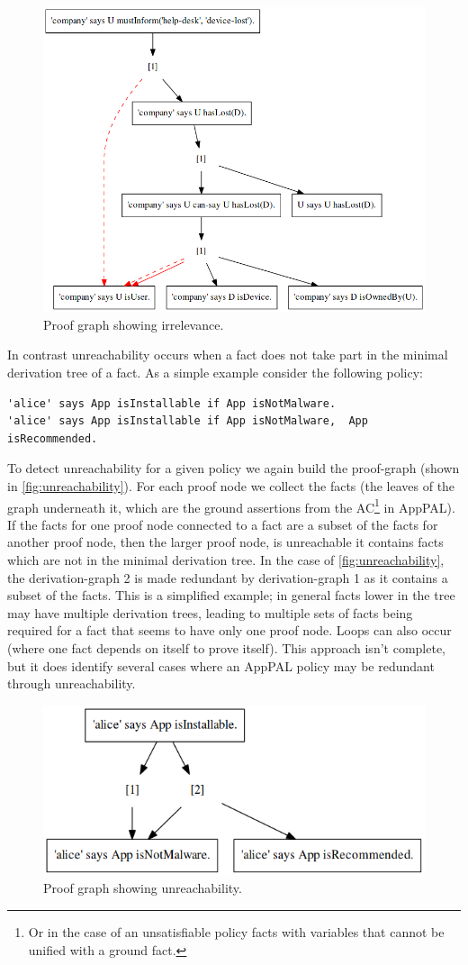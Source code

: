 \documentclass[a4paper]{scrartcl}
\begin{document}
\begin{figure}
  \centering
  \includegraphics[width=0.5\linewidth]{./figures/irrelevance.png}
  \caption{Proof graph showing irrelevance.}
  \label{fig:irrelevance}
\end{figure}

In contrast unreachability occurs when a fact does not take part in the minimal
derivation tree of a fact.  As a simple example consider the following policy:

\begin{lstlisting}
'alice' says App isInstallable if App isNotMalware.
'alice' says App isInstallable if App isNotMalware,  App isRecommended.
\end{lstlisting}

To detect unreachability for a given policy we again build the proof-graph (shown
in \autoref{fig:unreachability}).  For each proof node we collect the facts
(the leaves of the graph underneath it, which are the ground assertions from the
AC\footnote{Or in the case of an unsatisfiable policy facts with variables that
  cannot be unified with a ground fact.} in
AppPAL).  If the facts for one proof node connected to a fact are a subset of
the facts for another proof node, then the larger proof node, is unreachable it
contains facts which are not in the minimal derivation tree.   In the case of
\autoref{fig:unreachability}, the derivation-graph 2 is made redundant by
derivation-graph 1 as it contains a subset of the facts.  This is a
simplified example; in general facts lower in the tree may have multiple
derivation trees, leading to multiple sets of facts being required for a fact
that seems to have only one proof node.  Loops can also occur (where one fact
depends on itself to prove itself).  This approach isn't complete, but it does
identify several cases where an AppPAL policy may be redundant through
unreachability.



\begin{figure}
  \centering
  \includegraphics[width=0.5\linewidth]{./figures/unreachability.png}
  \caption{Proof graph showing unreachability.}
  \label{fig:unreachability}
\end{figure}
\end{document}
